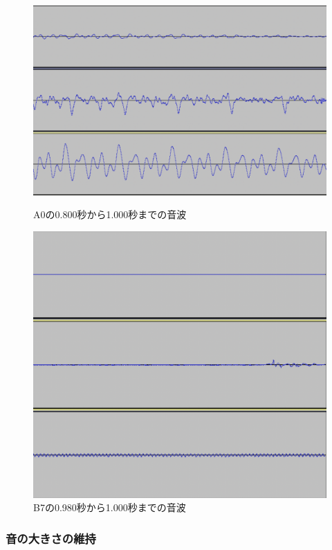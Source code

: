 \begin{figure}[b]
\centering
\begin{minipage}{0.48\columnwidth}
\centering
\includegraphics[width=0.85\columnwidth]{figure/88_88_det/a0_0800_1000.png}
\caption[A0の音波]{A0の0.800秒から1.000秒までの音波}
\label{fig:88_88_reduce1}
\end{minipage}
\begin{minipage}{0.48\columnwidth}
\centering
\includegraphics[width=0.75\columnwidth]{figure/88_88_det/b7_0980_1000.png}
\caption[B7の音波]{B7の0.980秒から1.000秒までの音波}
\label{fig:88_88_reduce2}
\end{minipage}
\end{figure}

\clearpage

\subsubsection{音の大きさの維持}


